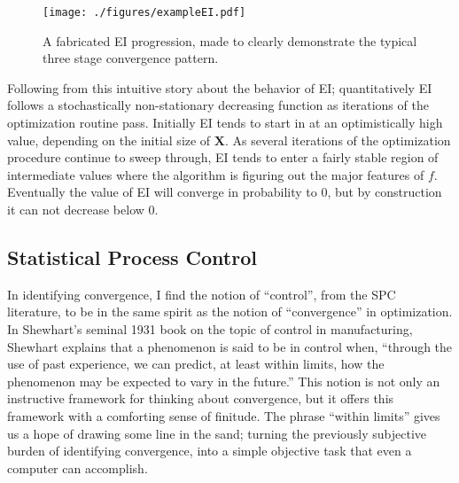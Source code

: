 \documentclass[12pt]{article}
\begin{document}
	\begin{wrapfigure}{l}{0.5\textwidth}
	\vspace{-1.1cm}
	\begin{center}
	\texttt{[image: ./figures/exampleEI.pdf]}
	\end{center}
	\vspace{-0.85cm}
	\caption{A fabricated EI progression, made to clearly demonstrate the typical three stage convergence pattern.}
	\label{EIxEX}
	\end{wrapfigure}
	
	Following from this intuitive story about the behavior of EI; quantitatively EI follows a stochastically non-stationary decreasing function as iterations of the optimization routine pass.
	Initially EI tends to start in at an optimistically high value, depending on the initial size of $\bm{X}$.
	As several iterations of the optimization procedure continue to sweep through, EI tends to enter a fairly stable region of intermediate values where the algorithm is figuring out the major features of $f$.
	Eventually the value of EI will converge in probability to 0, but by construction it can not decrease below 0.
	
	\subsection{Statistical Process Control}
	
	In identifying convergence, I find the notion of ``control'', from the SPC literature, to be in the same spirit as the notion of ``convergence'' in optimization. 
	In Shewhart's seminal 1931 book \cite{shewhartBook} on the topic of control in manufacturing, Shewhart explains that a phenomenon is said to be in control when, ``through the use of past experience, we can predict, at least within limits, how the phenomenon may be expected to vary in the future.''
	This notion is not only an instructive framework for thinking about convergence, but it offers this framework with a comforting sense of finitude. 
	The phrase ``within limits'' gives us a hope of drawing some line in the sand; turning the previously subjective burden of identifying convergence, into a simple objective task that even a computer can accomplish.
	
\end{document}
